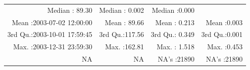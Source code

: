 \documentclass[
  10pt,
  a4paper,oneside]{article}
\begin{document}
\begin{longtable}[]{@{}rrrr@{}}
\begin{minipage}[t]{0.19\columnwidth}
Median : 89.30\strut
\end{minipage} & \begin{minipage}[t]{0.19\columnwidth}\raggedleft
Median : 0.002\strut
\end{minipage} & \begin{minipage}[t]{0.19\columnwidth}\raggedleft
Median :0.000\strut
\end{minipage}\tabularnewline
\begin{minipage}[t]{0.33\columnwidth}\raggedleft
Mean :2003-07-02 12:00:00\strut
\end{minipage} & \begin{minipage}[t]{0.19\columnwidth}\raggedleft
Mean : 89.66\strut
\end{minipage} & \begin{minipage}[t]{0.19\columnwidth}\raggedleft
Mean : 0.213\strut
\end{minipage} & \begin{minipage}[t]{0.19\columnwidth}\raggedleft
Mean :0.003\strut
\end{minipage}\tabularnewline
\begin{minipage}[t]{0.33\columnwidth}\raggedleft
3rd Qu.:2003-10-01 17:59:45\strut
\end{minipage} & \begin{minipage}[t]{0.19\columnwidth}\raggedleft
3rd Qu.:117.56\strut
\end{minipage} & \begin{minipage}[t]{0.19\columnwidth}\raggedleft
3rd Qu.: 0.349\strut
\end{minipage} & \begin{minipage}[t]{0.19\columnwidth}\raggedleft
3rd Qu.:0.001\strut
\end{minipage}\tabularnewline
\begin{minipage}[t]{0.33\columnwidth}\raggedleft
Max. :2003-12-31 23:59:30\strut
\end{minipage} & \begin{minipage}[t]{0.19\columnwidth}\raggedleft
Max. :162.81\strut
\end{minipage} & \begin{minipage}[t]{0.19\columnwidth}\raggedleft
Max. : 1.518\strut
\end{minipage} & \begin{minipage}[t]{0.19\columnwidth}\raggedleft
Max. :0.453\strut
\end{minipage}\tabularnewline
\begin{minipage}[t]{0.33\columnwidth}\raggedleft
NA\strut
\end{minipage} & \begin{minipage}[t]{0.19\columnwidth}\raggedleft
NA\strut
\end{minipage} & \begin{minipage}[t]{0.19\columnwidth}\raggedleft
NA's :21890\strut
\end{minipage} & \begin{minipage}[t]{0.19\columnwidth}\raggedleft
NA's :21890\strut
\end{minipage}\tabularnewline
\bottomrule
\end{longtable}
\end{document}
